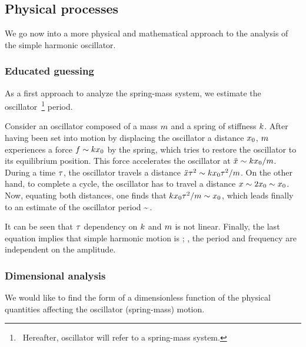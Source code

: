 \subsection{Physical processes}
We go now into a more physical and mathematical approach to the analysis of the simple harmonic oscillator.


\subsubsection{Educated guessing}\label{subsubsec:guessingsimpleoscillator}
As a first approach to analyze the spring-mass system, we estimate the oscillator~\footnote{~Hereafter, oscillator will refer to a spring-mass system.} period.

Consider an oscillator composed of a mass $m$ and a spring of stiffness $k$. After having been set into motion by displacing the oscillator a distance $x_0$, $m$ experiences a force $f\sim kx_0$ by the spring, which tries to restore the oscillator to its equilibrium position. This force accelerates the oscillator at $\ddot{x}\sim kx_0/m$. During a time $\tau$, the oscillator travels a distance $\ddot{x}\tau^2\sim kx_0\tau^2/m$. On the other hand, to complete a cycle, the oscillator has to travel a distance $x\sim 2x_0\sim x_0$. Now, equating both distances, one finds that $kx_0\tau^2/m\sim x_0$, which leads finally to an estimate of the oscillator period
\beq
\oper\sim\sqrt{\dfrac{\mass}{\kspring}}\,.
\eeq

It can be seen that $\tau$ dependency on $k$ and $m$ is not linear. Finally, the last equation implies that simple harmonic motion is ; \ie, the period and frequency are independent on the amplitude.


\subsubsection{Dimensional analysis}
We would like to find the form of a dimensionless function of the physical quantities affecting the oscillator (spring-mass) motion.

